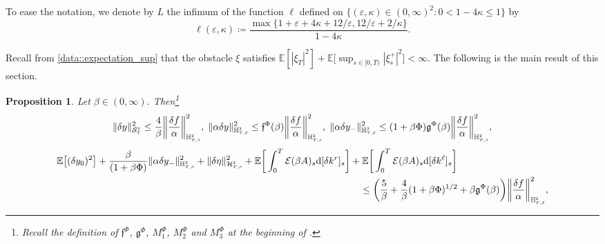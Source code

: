 \documentclass[10pt]{article} %
\newtheorem{proposition}[theorem]{Proposition}
\newcommand\cE{\mathcal E}
\newcommand\cH{\mathcal H}
\newcommand\cS{\mathcal S}
\newcommand{\smalltext}[1]{\text{\fontsize{4}{4}\selectfont$#1$}}
\newcommand\ff{\mathfrak f}
\newcommand\fg{\mathfrak g}
\def \E{\mathbb{E}}
\def \H{\mathbb{H}}
\newcommand{\1}{\mathbf{1}}
\def\d{\mathrm{d}}
\begin{document}
To ease the notation, we denote by $L$ the infimum of the function $\ell$ defined on $\{(\varepsilon,\kappa) \in (0,\infty)^2 : 0 < 1-4\kappa \leq 1\}$ by
\begin{equation*}
	\ell(\varepsilon,\kappa) \coloneqq \frac{\max\{1 + \varepsilon+4\kappa + 12/\varepsilon,12/\varepsilon + 2/\kappa\}}{1-4\kappa}.
\end{equation*}

Recall from \ref{data::expectation_sup} that the obstacle $\xi$ satisfies $\E[|\xi_T|^2] + \E\big[ \sup_{s \in [0,T)} |\xi^+_s|^2  \big] < \infty.$ The following is the main result of this section.
\begin{proposition}\label{prop::apriori}
	Let $\beta \in (0,\infty)$. Then\footnote{Recall the definition of $\ff^\Phi$, $\fg^\Phi$, $M^\Phi_1$, $M^\Phi_2$ and $M^\Phi_3$ at the beginning of .}
	\begin{equation*}
			\|\delta y\|^2_{\cS^\smalltext{2}_\smalltext{T}} \leq \frac{4}{\beta} \bigg\| \frac{\delta f}{\alpha} \bigg\|^2_{\H^{\smalltext{2}}_{\smalltext{T}\smalltext{,}\smalltext{\beta}}},
			\;
			\|\alpha \delta y\|^2_{\H^{\smalltext{2}}_{\smalltext{T}\smalltext{,}\smalltext{\beta}}} 
			\leq \ff^\Phi(\beta) \bigg\| \frac{\delta f}{\alpha} \bigg\|^2_{\H^{\smalltext{2}}_{\smalltext{T}\smalltext{,}\smalltext{\beta}}},
			\;
			\|\alpha \delta y_-\|^2_{\H^\smalltext{2}_{\smalltext{T}\smalltext{,}\smalltext{\beta}}} 
			\leq (1+\beta\Phi) \fg^\Phi(\beta)\bigg\|\frac{\delta f}{\alpha}\bigg\|^2_{\mathbb{H}^\smalltext{2}_{\smalltext{T}\smalltext{,}\smalltext{\beta}}},
	\end{equation*}
	\begin{align*}
		\E\big[(\delta y_0)^2\big] + \frac{\beta}{(1+\beta\Phi)}\|\alpha\delta y_{-}\|^2_{\H^\smalltext{2}_{\smalltext{T}\smalltext{,}\smalltext{\beta}}} + \|\delta\eta\|^2_{\cH^\smalltext{2}_{\smalltext{T}\smalltext{,}\smalltext{\beta}}} + \E\bigg[\int_0^T \cE(\beta A)_s \d[\delta k^r]_s\bigg] &+ \E\bigg[\int_0^T \cE(\beta A)_s \d[\delta k^\ell]_s\bigg]  \\
		&\quad \leq \bigg( \frac{5}{\beta} + \frac{4}{\beta}(1+\beta\Phi)^{1/2} + \beta \fg^\Phi(\beta) \bigg)\bigg\|\frac{\delta f}{\alpha}\bigg\|^2_{\H^\smalltext{2}_{\smalltext{T}\smalltext{,}\smalltext{\beta}}},
	\end{align*}


\end{proposition}
\end{document}
